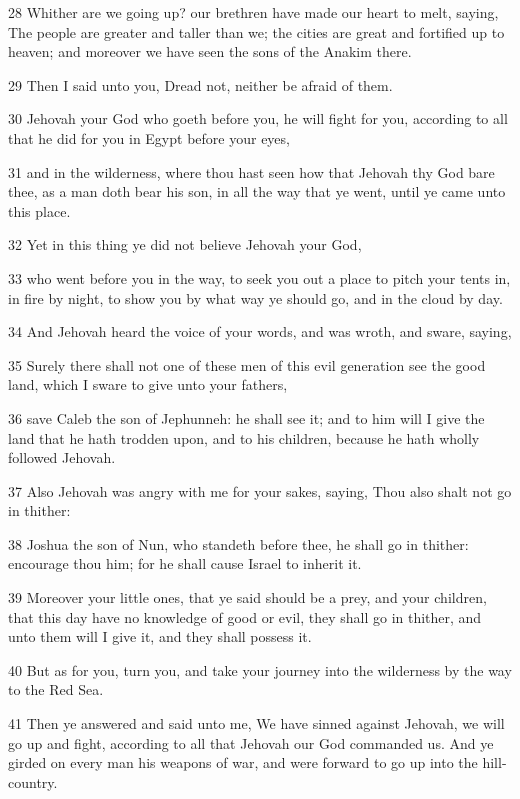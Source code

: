 \par 28 Whither are we going up? our brethren have made our heart to melt, saying, The people are greater and taller than we; the cities are great and fortified up to heaven; and moreover we have seen the sons of the Anakim there.
\par 29 Then I said unto you, Dread not, neither be afraid of them.
\par 30 Jehovah your God who goeth before you, he will fight for you, according to all that he did for you in Egypt before your eyes,
\par 31 and in the wilderness, where thou hast seen how that Jehovah thy God bare thee, as a man doth bear his son, in all the way that ye went, until ye came unto this place.
\par 32 Yet in this thing ye did not believe Jehovah your God,
\par 33 who went before you in the way, to seek you out a place to pitch your tents in, in fire by night, to show you by what way ye should go, and in the cloud by day.
\par 34 And Jehovah heard the voice of your words, and was wroth, and sware, saying,
\par 35 Surely there shall not one of these men of this evil generation see the good land, which I sware to give unto your fathers,
\par 36 save Caleb the son of Jephunneh: he shall see it; and to him will I give the land that he hath trodden upon, and to his children, because he hath wholly followed Jehovah.
\par 37 Also Jehovah was angry with me for your sakes, saying, Thou also shalt not go in thither:
\par 38 Joshua the son of Nun, who standeth before thee, he shall go in thither: encourage thou him; for he shall cause Israel to inherit it.
\par 39 Moreover your little ones, that ye said should be a prey, and your children, that this day have no knowledge of good or evil, they shall go in thither, and unto them will I give it, and they shall possess it.
\par 40 But as for you, turn you, and take your journey into the wilderness by the way to the Red Sea.
\par 41 Then ye answered and said unto me, We have sinned against Jehovah, we will go up and fight, according to all that Jehovah our God commanded us. And ye girded on every man his weapons of war, and were forward to go up into the hill-country.
